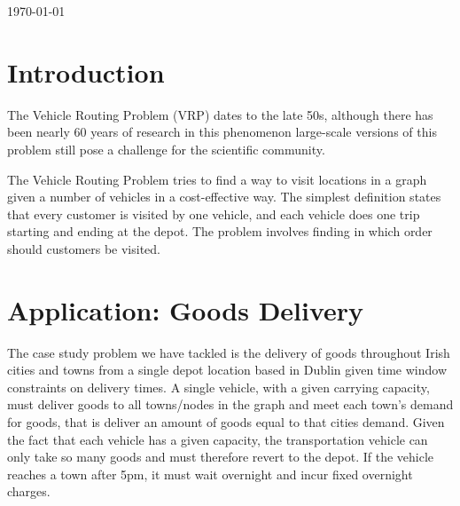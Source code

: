 \documentclass[a4paper,11pt]{article}
\begin{document}
\begin{titlepage}
{\large \today}\\[3cm] %


 

\vfill %

\end{titlepage}

\section{Introduction}
The Vehicle Routing Problem (VRP) dates to the late 50s, although there has been nearly 60 years of research in this phenomenon large-scale versions of this problem still pose a challenge for the scientific community. 

The Vehicle Routing Problem tries to find a way to visit locations in a graph given a number of vehicles in a cost-effective way. The simplest definition states that every customer is visited by one vehicle, and each vehicle does one trip starting and ending at the depot. The problem involves finding in which order should customers be visited. 

\section{Application: Goods Delivery}
The case study problem we have tackled is the delivery of goods throughout Irish cities and towns from a single depot location based in Dublin given time window constraints on delivery times. A single vehicle, with a given carrying capacity, must deliver goods to all towns/nodes in the graph and meet each town's demand for goods, that is deliver an amount of goods equal to that cities demand. Given the fact that each vehicle has a given capacity, the transportation vehicle can only take so many goods and must therefore revert to the depot. If the vehicle reaches a town after 5pm, it must wait overnight and incur fixed overnight charges.
\end{document}
